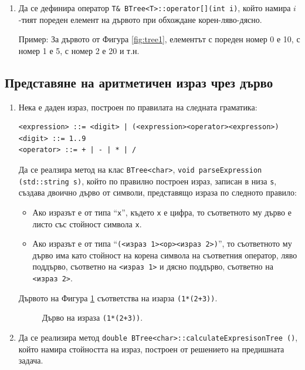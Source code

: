 \documentclass[12pt,a4paper]{article}
\newcommand{\code}[1]{\texttt{#1}}
\begin{document}
\begin{enumerate}[resume]
  \item Да се дефинира оператор \texttt{T\& BTree<T>::operator[](int i)}, който намира $i$-тият пореден елемент на дървото при обхождане корен-ляво-дясно.

  Пример: За дървото от Фигура \ref{fig:tree1}, елементът с пореден номер 0 е 10, с номер 1 е 5, с номер 2 е 20 и т.н.
\end{enumerate}

\subsection {Представяне на аритметичен израз чрез дърво}
\begin{enumerate}[resume]
\item Нека е даден израз, построен по правилата на следната граматика:

\begin{verbatim}
<expression> ::= <digit> | (<expression><operator><expresson>)
<digit> ::= 1..9
<operator> ::= + | - | * | /
\end{verbatim}

Да се реалзира метод на клас \code{BTree<char>}, \code{void parseExpression (std::string s)}, който по правилно построен израз, записан в низа \texttt{s}, създава двоично дърво от символи, представящо израза по следното правило:
\begin{itemize}
  \item Ако изразът е от типа ``\texttt{x}'', където \texttt{x} е цифра, то съответното му дърво е листо със стойност символа \texttt{x}.
  \item Ако изразът е от типа ``\texttt{(<израз 1><op><израз 2>)}'', то съответното му дърво има като стойност на корена символа на съответния оператор, ляво поддърво, съответно на \texttt{<израз 1>} и дясно поддърво, съответно на \texttt{<израз 2>}.
\end{itemize}

Дървото на Фигура \ref{fig:treeexpr} съответства на изарза \code{(1*(2+3))}.

\begin{figure}
\centering
{}
\caption{Дърво на израза \code{(1*(2+3))}.}
\label{fig:treeexpr}
\end{figure}

\item Да се реализира метод \texttt{double BTree<char>::calculateExpresisonTree ()}, който намира стойността на израз, построен от решението на предишната задача.

\end{enumerate}
\end{document}
